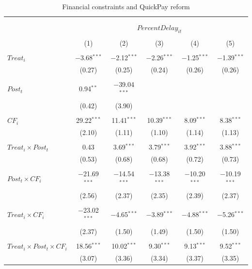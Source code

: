 \documentclass[
]{article}
\begin{document}
\begin{table}[H] \centering 
  \caption{Financial constraints and QuickPay reform} 
  \label{} 
\small 
\begin{tabular}{@{\extracolsep{-2pt}}lccccc} 
\\[-1.8ex]\hline 
\hline \\[-1.8ex] 
\\[-1.8ex] & \multicolumn{5}{c}{$PercentDelay_{it}$  } \\ 
\\[-1.8ex] & (1) & (2) & (3) & (4) & (5)\\ 
\hline \\[-1.8ex] 
 $Treat_i$ & $-$3.68$^{***}$ & $-$2.12$^{***}$ & $-$2.26$^{***}$ & $-$1.25$^{***}$ & $-$1.39$^{***}$ \\ 
  & (0.27) & (0.25) & (0.24) & (0.26) & (0.26) \\ 
  & & & & & \\ 
 $Post_t$ & 0.94$^{**}$ & $-$39.04$^{***}$ &  &  &  \\ 
  & (0.42) & (3.90) &  &  &  \\ 
  & & & & & \\ 
 $CF_i$ & 29.22$^{***}$ & 11.41$^{***}$ & 10.39$^{***}$ & 8.09$^{***}$ & 8.38$^{***}$ \\ 
  & (2.10) & (1.11) & (1.10) & (1.14) & (1.13) \\ 
  & & & & & \\ 
 $Treat_i \times Post_t$ & 0.43 & 3.69$^{***}$ & 3.79$^{***}$ & 3.92$^{***}$ & 3.88$^{***}$ \\ 
  & (0.53) & (0.68) & (0.68) & (0.72) & (0.73) \\ 
  & & & & & \\ 
 $Post_t \times CF_i$ & $-$21.69$^{***}$ & $-$14.54$^{***}$ & $-$13.38$^{***}$ & $-$10.20$^{***}$ & $-$10.19$^{***}$ \\ 
  & (2.56) & (2.37) & (2.35) & (2.39) & (2.37) \\ 
  & & & & & \\ 
 $Treat_i \times CF_i$ & $-$23.02$^{***}$ & $-$4.65$^{***}$ & $-$3.89$^{***}$ & $-$4.88$^{***}$ & $-$5.26$^{***}$ \\ 
  & (2.37) & (1.50) & (1.49) & (1.50) & (1.50) \\ 
  & & & & & \\ 
 $Treat_i \times Post_t \times CF_i$ & 18.56$^{***}$ & 10.02$^{***}$ & 9.30$^{***}$ & 9.13$^{***}$ & 9.52$^{***}$ \\ 
  & (3.07) & (3.36) & (3.34) & (3.37) & (3.35) \\ 

\end{tabular}
\end{table}
\end{document}
